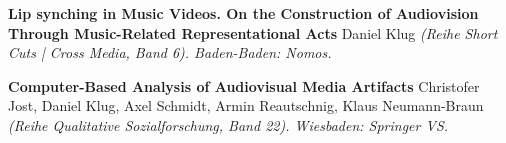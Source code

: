 \documentclass[9pt]{article}
\begin{document}


\medskip



\noindent\textbf{Lip synching in Music Videos. On the Construction of Audiovision}\vspace{-0.03in}
\newline\noindent\textbf{Through Music-Related Representational Acts}\dates{}
\newline{}\dates{}\vspace{-0.03in}
\newline{}
\newline\noindent Daniel Klug
\newline\noindent\emph{(Reihe Short Cuts | Cross Media, Band 6). Baden-Baden: Nomos.}
\bigskip

\pagebreak

\noindent\textbf{Computer-Based Analysis of Audiovisual Media Artifacts}
\newline{}\dates{}
\newline\noindent Christofer Jost, Daniel Klug, Axel Schmidt, Armin Reautschnig, Klaus Neumann-Braun
\newline\noindent\emph{(Reihe Qualitative Sozialforschung, Band 22). Wiesbaden: Springer VS.}
\bigskip


\end{document}
